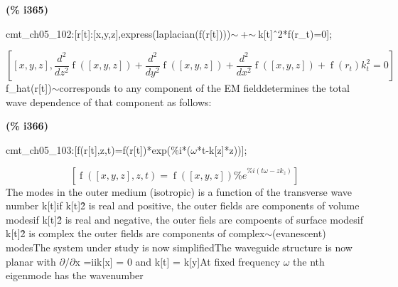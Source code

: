 \documentclass[fleqn]{article}
\begin{document}
\noindent
\begin{minipage}[t]{4.000000em}\color{red}\bfseries
(\% i365)	
\end{minipage}
\begin{minipage}[t]{\textwidth}\color{blue}
cmt\_ch05\_102:[r[t]:[x,y,z],express(laplacian(f(r[t])))\ensuremath{\sim\ }+\ensuremath{\sim\ }k[t]\^\ 2*f(r\_t)=0];
\end{minipage}
\[\displaystyle \tag{\% o365} 
\left[ \left[ x\operatorname{,}y\operatorname{,}z\right] \operatorname{,}\frac{{{d}^{2}}}{d {{z}^{2}}} \operatorname{f}\left( \left[ x\operatorname{,}y\operatorname{,}z\right] \right) +\frac{{{d}^{2}}}{d {{y}^{2}}} \operatorname{f}\left( \left[ x\operatorname{,}y\operatorname{,}z\right] \right) +\frac{{{d}^{2}}}{d {{x}^{2}}} \operatorname{f}\left( \left[ x\operatorname{,}y\operatorname{,}z\right] \right) +\operatorname{f}\left( {r_t}\right)  {{k}_{t}^{2}}=0\right] \mbox{}
\]
f\_hat(r[t])\ensuremath{\sim }corresponds to any component of the EM fielddetermines the total wave dependence of that component as follows:


\noindent
\begin{minipage}[t]{4.000000em}\color{red}\bfseries
(\% i366)	
\end{minipage}
\begin{minipage}[t]{\textwidth}\color{blue}
cmt\_ch05\_103:[f(r[t],z,t)=f(r[t])*exp(\%i*(\ensuremath{\omega}*t-k[z]*z))];
\end{minipage}
\[\displaystyle \tag{\% o366} 
\left[ \operatorname{f}\left( \left[ x\operatorname{,}y\operatorname{,}z\right] \operatorname{,}z\operatorname{,}t\right) =\operatorname{f}\left( \left[ x\operatorname{,}y\operatorname{,}z\right] \right)  {{\% e}^{\% i \left( t \omega -z {k_z}\right) }}\right] \mbox{}
\]
The modes in the outer medium (isotropic) is a function of the transverse wave number k[t]if k[t]\^ 2 is real and positive, the outer fields are components of volume modesif k[t]\^ 2 is real and negative, the outer fiels are compoents of surface modesif k[t]\^ 2 is complex the outer fields are components of complex\ensuremath{\sim }(evanescent) modesThe system under study is now simplifiedThe waveguide structure is now planar with \ensuremath{\partial}/\ensuremath{\partial}x =iik[x] = 0 and k[t] = k[y]At fixed frequency \ensuremath{\omega} the nth eigenmode has the wavenumber
\end{document}
